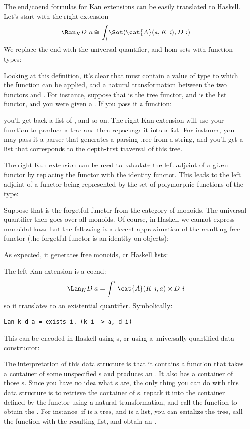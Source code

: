 The end/coend formulas for Kan extensions can be easily translated to
Haskell. Let's start with the right extension:
\[\Ran_{K}D\ a \cong \int_i \Set(\cat{A}(a, K\ i), D\ i)\]
We replace the end with the universal quantifier, and hom-sets with
function types:

Looking at this definition, it's clear that  must contain a
value of type  to which the function can be applied, and a
natural transformation between the two functors  and
. For instance, suppose that  is the tree functor,
and  is the list functor, and you were given a
. If you pass it a function:

you'll get back a list of , and so on. The right Kan
extension will use your function to produce a tree and then repackage it
into a list. For instance, you may pass it a parser that generates a
parsing tree from a string, and you'll get a list that corresponds to
the depth-first traversal of this tree.

The right Kan extension can be used to calculate the left adjoint of a
given functor by replacing the functor  with the identity
functor. This leads to the left adjoint of a functor  being
represented by the set of polymorphic functions of the type:

Suppose that  is the forgetful functor from the category of
monoids. The universal quantifier then goes over all monoids. Of course,
in Haskell we cannot express monoidal laws, but the following is a
decent approximation of the resulting free functor (the forgetful
functor  is an identity on objects):

As expected, it generates free monoids, or Haskell lists:

The left Kan extension is a coend:
\[\Lan_{K}D\ a = \int^i \cat{A}(K\ i, a)\times{}D\ i\]
so it translates to an existential quantifier. Symbolically:

\begin{Verbatim}
Lan k d a = exists i. (k i -> a, d i)
\end{Verbatim}
This can be encoded in Haskell using s, or using a universally
quantified data constructor:

The interpretation of this data structure is that it contains a function
that takes a container of some unspecified s and produces an
. It also has a container of those s. Since you have
no idea what s are, the only thing you can do with this data
structure is to retrieve the container of s, repack it into
the container defined by the functor  using a natural
transformation, and call the function to obtain the . For
instance, if  is a tree, and  is a list, you can
serialize the tree, call the function with the resulting list, and
obtain an .

